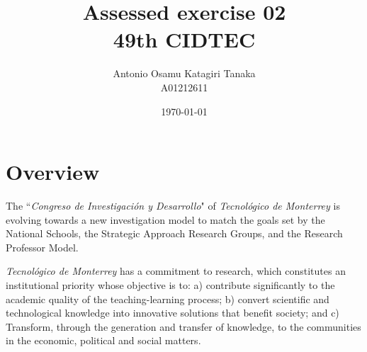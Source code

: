 \documentclass[11pt,a4paper]{article}
\title
{
    Assessed exercise 02\\
    49th CIDTEC
}
\author
{
    Antonio Osamu Katagiri Tanaka \\
    A01212611
}
\date{\today}
\providecommand{\keywords}[1]
{
    \\
    \\
    \small
    \textbf{\textit{Keywords:}} #1
}
\begin{document}

\maketitle



\clearpage


\tableofcontents
\clearpage


\listoffigures
\listoftables
\clearpage

\section{Overview}\label{sec:overview}
The ``\emph{Congreso de Investigación y Desarrollo}" of \emph{Tecnológico de Monterrey} is evolving towards a new investigation model to match the goals set by the National Schools, the Strategic Approach Research Groups, and the Research Professor Model.

\emph{Tecnológico de Monterrey} has a commitment to research, which constitutes an institutional priority whose objective is to: a) contribute significantly to the academic quality of the teaching-learning process; b) convert scientific and technological knowledge into innovative solutions that benefit society; and c) Transform, through the generation and transfer of knowledge, to the communities in the economic, political and social matters.
\end{document}

